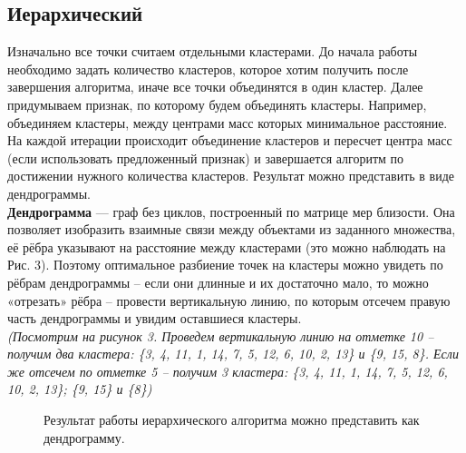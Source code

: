\documentclass[12pt, a4paper]{article}
\begin{document}
\subsection{Иерархический}
Изначально все точки считаем отдельными кластерами. До начала работы необходимо задать количество кластеров, которое хотим получить после завершения алгоритма, иначе все точки объединятся в один кластер. Далее придумываем признак, по которому будем объединять кластеры. Например, объединяем кластеры, между центрами масс которых минимальное расстояние.
 На каждой итерации происходит объединение кластеров и пересчет центра масс (если использовать предложенный признак) и завершается алгоритм по достижении нужного количества кластеров. Результат можно представить в виде дендрограммы. \\\textbf{Дендрограмма} --- граф без циклов, построенный по матрице мер близости. Она позволяет изобразить взаимные связи между объектами из заданного множества, её рёбра указывают на расстояние между кластерами (это можно наблюдать на Рис. 3). Поэтому оптимальное разбиение точек на кластеры можно увидеть по рёбрам дендрограммы -- если они длинные и их достаточно мало, то можно «отрезать» рёбра -- провести вертикальную линию, по которым отсечем правую часть дендрограммы и увидим оставшиеся кластеры. \\\textit{(Посмотрим на рисунок 3. Проведем вертикальную линию на отметке 10 -- получим два кластера: \{3, 4, 11, 1, 14, 7, 5, 12, 6, 10, 2, 13\} и \{9, 15, 8\}. Если же отсечем по отметке 5 -- получим 3 кластера: \{3, 4, 11, 1, 14, 7, 5, 12, 6, 10, 2, 13\}; \{9, 15\} и \{8\})}
 \begin{figure}[h!]
\caption{Результат работы иерархического алгоритма можно представить как дендрограмму.}
\label{fig:dbscan}
\end{figure}
\end{document}
